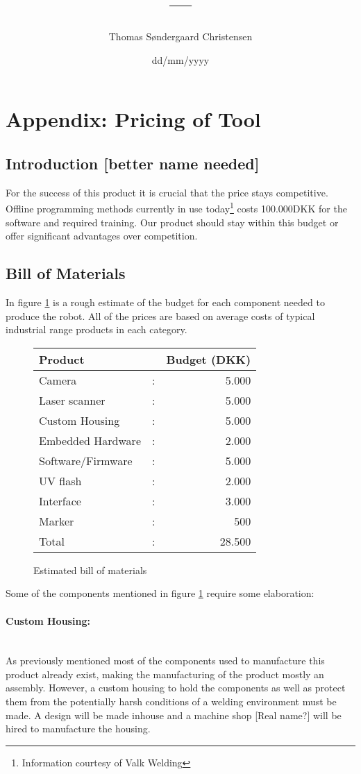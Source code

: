 \documentclass[11pt,a4paper]{article}
\author{Thomas Søndergaard Christensen}
\title{---}
\date{dd/mm/yyyy}
\begin{document}
\section{Appendix: Pricing of Tool}
\subsection{Introduction [better name needed]}
For the success of this product it is crucial that the price stays competitive. Offline programming methods currently in use today\footnote{Information courtesy of Valk Welding} costs 100.000DKK for the software and required training. Our product should stay within this budget or offer significant advantages over competition.
\subsection{Bill of Materials}
In figure \ref{tab:BoM} is a rough estimate of the budget for each component needed to produce the robot. All of the prices are based on average costs of typical industrial range products in each category.  
\begin{figure}[h!]
\label{tab:BoM}
	\begin{center}
		\begin{tabular}{l c r}
		Product            & & Budget (DKK)\\
		\hline
		Camera 				& : & 5.000  \\
		Laser scanner		& : & 5.000 \\
		Custom Housing		& : & 5.000\\
		Embedded Hardware	& : & 2.000\\
		Software/Firmware	& : & 5.000\\
		UV flash			& : & 2.000\\
		Interface			& : & 3.000\\
		Marker				& : & 500\\[0.2cm]
		\hline
		Total				& : & 28.500\\ 
		\end{tabular}
	\end{center}
	\caption{Estimated bill of materials}
\end{figure}
Some of the components mentioned in figure \ref{tab:BoM} require some elaboration:
\paragraph{Custom Housing:}~\\
As previously mentioned most of the components used to manufacture this product already exist, making the manufacturing of the product mostly an assembly. However, a custom housing to hold the components as well as protect them from the potentially harsh conditions of a welding environment must be made. A design will be made inhouse and a machine shop [Real name?] will be hired to manufacture the housing.
\end{document}
